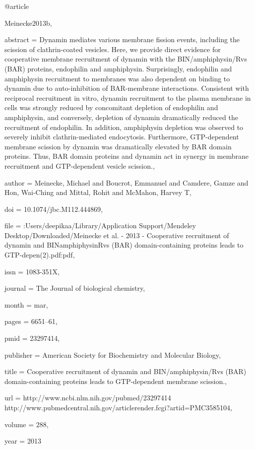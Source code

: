 @article{Meinecke2013b,

abstract = {Dynamin mediates various membrane fission events, including the scission of clathrin-coated vesicles. Here, we provide direct evidence for cooperative membrane recruitment of dynamin with the BIN/amphiphysin/Rvs (BAR) proteins, endophilin and amphiphysin. Surprisingly, endophilin and amphiphysin recruitment to membranes was also dependent on binding to dynamin due to auto-inhibition of BAR-membrane interactions. Consistent with reciprocal recruitment in vitro, dynamin recruitment to the plasma membrane in cells was strongly reduced by concomitant depletion of endophilin and amphiphysin, and conversely, depletion of dynamin dramatically reduced the recruitment of endophilin. In addition, amphiphysin depletion was observed to severely inhibit clathrin-mediated endocytosis. Furthermore, GTP-dependent membrane scission by dynamin was dramatically elevated by BAR domain proteins. Thus, BAR domain proteins and dynamin act in synergy in membrane recruitment and GTP-dependent vesicle scission.},

author = {Meinecke, Michael and Boucrot, Emmanuel and Camdere, Gamze and Hon, Wai-Ching and Mittal, Rohit and McMahon, Harvey T},

doi = {10.1074/jbc.M112.444869},

file = {:Users/deepikaa/Library/Application Support/Mendeley Desktop/Downloaded/Meinecke et al. - 2013 - Cooperative recruitment of dynamin and BINamphiphysinRvs (BAR) domain-containing proteins leads to GTP-depen(2).pdf:pdf},

issn = {1083-351X},

journal = {The Journal of biological chemistry},

month = {mar},

pages = {6651--61},

pmid = {23297414},

publisher = {American Society for Biochemistry and Molecular Biology},

title = {{Cooperative recruitment of dynamin and BIN/amphiphysin/Rvs (BAR) domain-containing proteins leads to GTP-dependent membrane scission.}},

url = {http://www.ncbi.nlm.nih.gov/pubmed/23297414 http://www.pubmedcentral.nih.gov/articlerender.fcgi?artid=PMC3585104},

volume = {288},

year = {2013}

}
